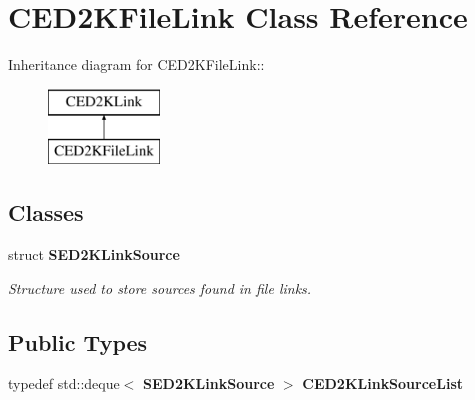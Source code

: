 \section{CED2KFileLink Class Reference}
\label{classCED2KFileLink}
Inheritance diagram for CED2KFileLink::\begin{figure}[H]
\begin{center}
\leavevmode
\includegraphics[height=2cm]{classCED2KFileLink}
\end{center}
\end{figure}
\subsection*{Classes}
\begin{DoxyCompactItemize}
\item 
struct {\bf SED2KLinkSource}
\begin{DoxyCompactList}\small\item\em Structure used to store sources found in file links. \item\end{DoxyCompactList}\end{DoxyCompactItemize}
\subsection*{Public Types}
\begin{DoxyCompactItemize}
\item 
typedef std::deque$<$ {\bf SED2KLinkSource} $>$ {\bfseries CED2KLinkSourceList}\label{classCED2KFileLink_a119459a72f3d8a0ad189c8215c7690dd}

\end{DoxyCompactItemize}
